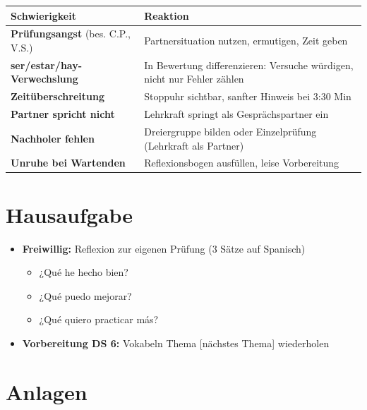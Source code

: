 \documentclass[11pt,a4paper]{article}
\begin{document}
\begin{tabular}{|p{4.5cm}|p{8cm}|}
\hline
\textbf{Schwierigkeit} & \textbf{Reaktion} \\
\hline
\textbf{Prüfungsangst} (bes. C.P., V.S.) & Partnersituation nutzen, ermutigen, Zeit geben \\
\hline
\textbf{ser/estar/hay-Verwechslung} & In Bewertung differenzieren: Versuche würdigen, nicht nur Fehler zählen \\
\hline
\textbf{Zeitüberschreitung} & Stoppuhr sichtbar, sanfter Hinweis bei 3:30 Min \\
\hline
\textbf{Partner spricht nicht} & Lehrkraft springt als Gesprächspartner ein \\
\hline
\textbf{Nachholer fehlen} & Dreiergruppe bilden oder Einzelprüfung (Lehrkraft als Partner) \\
\hline
\textbf{Unruhe bei Wartenden} & Reflexionsbogen ausfüllen, leise Vorbereitung \\
\hline
\end{tabular}

\section{Hausaufgabe}

\begin{itemize}
    \item \textbf{Freiwillig:} Reflexion zur eigenen Prüfung (3 Sätze auf Spanisch)
    \begin{itemize}
        \item ¿Qué he hecho bien?
        \item ¿Qué puedo mejorar?
        \item ¿Qué quiero practicar más?
    \end{itemize}
    \item \textbf{Vorbereitung DS 6:} Vokabeln Thema [nächstes Thema] wiederholen
\end{itemize}

\section{Anlagen}
\end{document}

